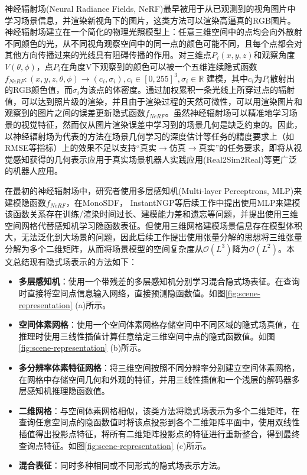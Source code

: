 神经辐射场(Neural Radiance Fields, NeRF)\cite{mildenhall_nerf_2020}最早被用于从已观测到的视角图片中学习场景信息，并渲染新视角下的图片，这类方法可以渲染高逼真的RGB图片。神经辐射场建立在一个简化的物理光照模型上：任意三维空间中的点均会向外散射不同颜色的光，从不同视角观察空间中的同一点的颜色可能不同，且每个点都会对其他方向传播过来的光线具有阻碍传播的作用。对三维点$P_i (x,y,z)$和观察角度$V(\theta,\phi)$，点$P_i$在角度V下观察到的颜色可以被一个五维连续隐式函数$f_{NeRF}:(x,y,z,\theta,\phi)\to (c_i,\sigma_i),c_i\in[0,255]^3,\sigma_i\in \mathbb{R}$ 建模，其中$c_i$为$P_i$散射出的RGB颜色值，而$\sigma_i$为该点的体密度。通过加权累积一条光线上所穿过点的辐射值，可以达到照片级的渲染，并且由于渲染过程的天然可微性，可以用渲染图片和观察到的图片之间的误差更新隐式函数$f_{NeRF}$。虽然神经辐射场可以精准地学习场景的视觉特征，然而仅从图片渲染误差中学习到的场景几何是缺乏约束的。因此，以神经辐射场为代表的方法在场景几何学习的深度估计等任务的精度要求上（如RMSE等指标）上的效果不足以支持“真实$\rightarrow$仿真$\rightarrow$真实”的任务要求，即将从视觉感知获得的几何表示应用于真实场景机器人实践应用(Real2Sim2Real)等更广泛的机器人应用。

在最初的神经辐射场中，研究者使用多层感知机(Multi-layer Perceptrons, MLP)来建模隐函数$f_{NeRF}$，在MonoSDF\cite{yu_monosdf_2022}， InstantNGP\cite{muller_instant_2022}等后续工作中提出使用MLP来建模该函数关系存在训练/渲染时间过长、建模能力差和遗忘等问题，并提出使用三维空间网格代替感知机学习隐函数表征。但使用三维网格建模场景信息存在模型体积大，无法泛化到大场景的问题，因此后续工作\cite{chen_tensorf_2022, fridovich-keil_k-planes_2023, cao_hexplane_2023, reiser_merf_2023}提出使用张量分解\cite{kolda_tensor_2009}的思想将三维张量分解为多个二维矩阵，从而将场景模型的空间复杂度从$\mathcal O (L^3)$降为$\mathcal O (L^2)$。本文总结现有隐式场表示的方法如下：
\begin{itemize}
    \item \textbf{多层感知机}：使用一个带残差的多层感知机分别学习混合隐式场表征。在查询时直接将空间点信息输入网络，直接预测隐函数值。如图\ref{fig:scene-representation} (a)所示。
    \item \textbf{空间体素网格}：使用一个空间体素网格存储空间中不同区域的隐式场真值，在推理时使用三线性插值计算任意给定三维空间中点的隐式函数值。如图\ref{fig:scene-representation} (b)所示。
    \item \textbf{多分辨率体素特征网格}：将三维空间按照不同分辨率分别建立空间体素网格，在网格中存储空间几何和外观的特征，并用三线性插值和一个浅层的解码器多层感知机推理隐函数值。
    \item \textbf{二维网格}：与空间体素网格相似，该类方法将隐式场表示为多个二维矩阵，在查询任意空间点的隐函数值时将该点投影到各个二维矩阵平面中，使用双线性插值得出投影点特征，将所有二维矩阵投影点的特征进行重新整合，得到最终查询点特征。如图\ref{fig:scene-representation} (c)所示。
    \item \textbf{混合表征}：同时多种相同或不同形式的隐式场表示方法。
\end{itemize}

